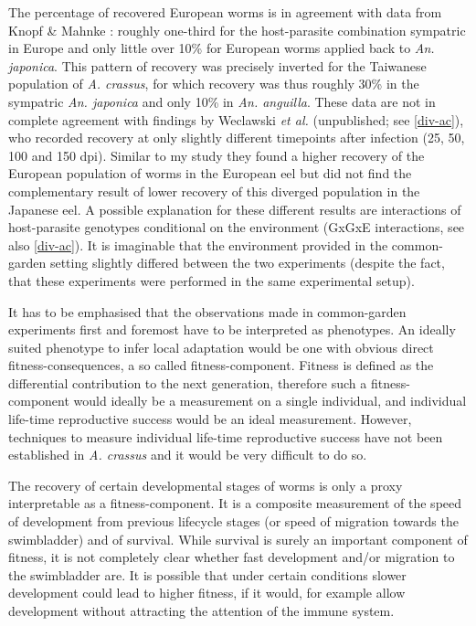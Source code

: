 The percentage of recovered European worms is in agreement with data
from Knopf \& Mahnke \cite{knopf_differences_2004}: roughly one-third
for the host-parasite combination sympatric in Europe and only little
over 10\% for European worms applied back to
\textit{An. japonica}. This pattern of recovery was precisely inverted
for the Taiwanese population of \textit{A. crassus}, for which
recovery was thus roughly 30\% in the sympatric \textit{An. japonica}
and only 10\% in \textit{An. anguilla}. These data are not in complete
agreement with findings by Weclawski \textit{et al.} (unpublished; see
\ref{div-ac}), who recorded recovery at only slightly different
timepoints after infection (25, 50, 100 and 150 dpi). Similar to my
study they found a higher recovery of the European population of worms
in the European eel but did not find the complementary result of lower
recovery of this diverged population in the Japanese eel. A possible
explanation for these different results are interactions of
host-parasite genotypes conditional on the environment (GxGxE
interactions, see also \ref{div-ac}). It is imaginable that the
environment provided in the common-garden setting slightly differed
between the two experiments (despite the fact, that these experiments
were performed in the same experimental setup).

It has to be emphasised that the observations made in common-garden
experiments first and foremost have to be interpreted as
phenotypes. An ideally suited phenotype to infer local adaptation
would be one with obvious direct fitness-consequences, a so called
fitness-component. Fitness is defined as the differential contribution
to the next generation, therefore such a fitness-component would
ideally be a measurement on a single individual, and individual
life-time reproductive success would be an ideal measurement. However,
techniques to measure individual life-time reproductive success have
not been established in \textit{A. crassus} and it would be very
difficult to do so.

The recovery of certain developmental stages of worms is only a proxy
interpretable as a fitness-component. It is a composite measurement of
the speed of development from previous lifecycle stages (or speed of
migration towards the swimbladder) and of survival. While survival is
surely an important component of fitness, it is not completely clear
whether fast development and/or migration to the swimbladder are. It
is possible that under certain conditions slower development could
lead to higher fitness, if it would, for example allow development
without attracting the attention of the immune system.

